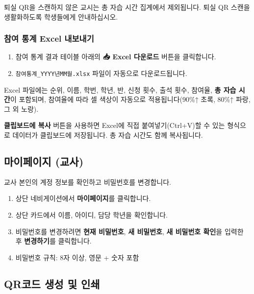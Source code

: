 \documentclass[a4paper,12pt]{article}
\newcommand{\menu}[1]{\textcolor{primary}{\textbf{#1}}}
\begin{document}
\begin{notebox}
  퇴실 QR을 스캔하지 않은 교시는 총 자습 시간 집계에서 제외됩니다.
  퇴실 QR 스캔을 생활화하도록 학생들에게 안내하십시오.
\end{notebox}

\subsubsection{참여 통계 Excel 내보내기}

\begin{enumerate}[leftmargin=1.5em]
    \item 참여 통계 결과 테이블 아래의 \menu{📥 Excel 다운로드} 버튼을 클릭합니다.
    \item \texttt{참여통계\_YYYY년MM월.xlsx} 파일이 자동으로 다운로드됩니다.
\end{enumerate}

Excel 파일에는 순위, 이름, 학번, 학년, 반, 신청 횟수, 출석 횟수, 참여율,
\textbf{총 자습 시간}이 포함되며,
참여율에 따라 셀 색상이 자동으로 적용됩니다(90\%↑ 초록, 80\%↑ 파랑, 그 외 노랑).

\begin{tipbox}
  \menu{클립보드에 복사} 버튼을 사용하면 Excel에 직접 붙여넣기(Ctrl+V)할 수 있는 형식으로
  데이터가 클립보드에 저장됩니다. 총 자습 시간도 함께 복사됩니다.
\end{tipbox}

\subsection{마이페이지 (교사)}

교사 본인의 계정 정보를 확인하고 비밀번호를 변경합니다.

\begin{enumerate}[leftmargin=1.5em]
    \item 상단 네비게이션에서 \menu{마이페이지}를 클릭합니다.
    \item 상단 카드에서 이름, 아이디, 담당 학년을 확인합니다.
    \item 비밀번호를 변경하려면 \textbf{현재 비밀번호}, \textbf{새 비밀번호},
          \textbf{새 비밀번호 확인}을 입력한 후 \menu{변경하기}를 클릭합니다.
    \item 비밀번호 규칙: 8자 이상, 영문 + 숫자 포함
\end{enumerate}

\subsection{QR코드 생성 및 인쇄}
\end{document}
